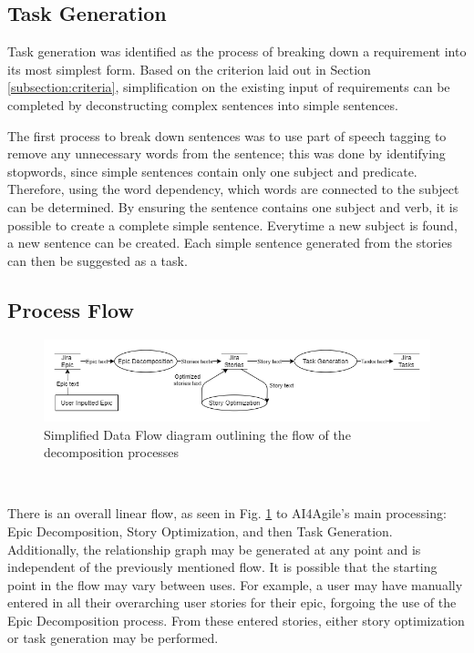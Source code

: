 \subsection{Task Generation}

Task generation was identified as the process of breaking down a requirement into its most simplest form. Based on the criterion laid out in Section \ref{subsection:criteria}, simplification on the existing input of requirements can be completed by deconstructing complex sentences into simple sentences. 

The first process to break down sentences was to use part of speech tagging to remove any unnecessary words from the sentence; this was done by identifying stopwords, since simple sentences contain only one subject and predicate. Therefore, using the word dependency, which words are connected to the subject can be determined. By ensuring the sentence contains one subject and verb, it is possible to create a complete simple sentence. Everytime a new subject is found, a new sentence can be created. Each simple sentence generated from the stories can then be suggested as a task.

\subsection{Process Flow}

\begin{figure}
\centering
\includegraphics[width=\textwidth,keepaspectratio]{./figure/ExampleDataFlowDiagram.png}
\caption{Simplified Data Flow diagram outlining the flow of the decomposition processes}
\label{fig:ExampleDataFlowDiagram}
\end{figure}\

There is an overall linear flow, as seen in Fig. \ref{fig:ExampleDataFlowDiagram} to AI4Agile’s main processing: Epic Decomposition, Story Optimization, and then Task Generation. Additionally, the relationship graph may be generated at any point and is independent of the previously mentioned flow. It is possible that the starting point in the flow may vary between uses. For example, a user may have manually entered in all their overarching user stories for their epic, forgoing the use of the Epic Decomposition process. From these entered stories, either story optimization or task generation may be performed.

